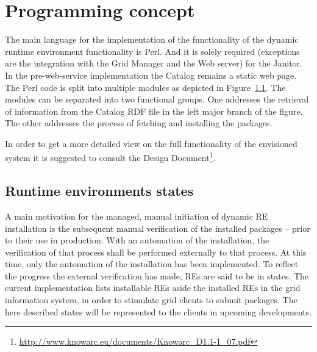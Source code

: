 \chapter{Programming concept}

 The main language for the implementation of the functionality of the
 dynamic runtime environment functionality is Perl. And it is solely required (exceptions are the
 integration with the Grid Manager and the Web server) for the Janitor. In
 the pre-web-service implementation the Catalog remains a static web page.
 The Perl code is split into multiple modules as depicted in Figure~\ref{fig:janitorDependencies}. 
 The modules can be separated into two
 functional groups. One addresses the retrieval of information from
 the Catalog RDF file in the left major branch of the figure. The other
 addresses the process of fetching and installing the packages.

 \begin{landscape}
\begin{figure}[!h]
\vspace{4cm}
 \begin{center} 
    \resizebox{24cm}{!}{}
 \end{center} 
\vfill
 \label{fig:janitorDependencies} 
\end{figure}
 \end{landscape}

In order to get a more detailed view on the full functionality of the envisioned system it is suggested to consult the 
Design Document\footnote{\href{http://www.knowarc.eu/documents/Knowarc_D1.1-1_07.pdf}
{http://www.knowarc.eu/documents/Knowarc\_D1.1-1\_07.pdf}}.




\section{Runtime environments states}
A main motivation for the managed, manual initiation of dynamic RE
installation is the subsequent manual verification of the installed
packages -- prior to their use in production.
With an automation of the installation, the verification of
that process shall be performed externally to that process.  At this
time, only the automation of the installation has been implemented.
To reflect the progress the external verification has made, REs
are said to be in states. The current implementation lists
installable REs aside the installed REs in the grid information system,
in order to stimulate grid clients to submit packages. The here described
states will be represented to the clients in upcoming developments.


